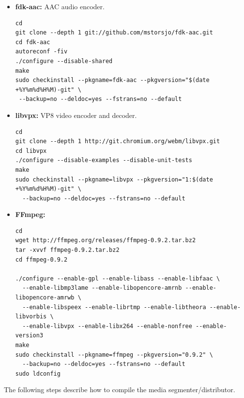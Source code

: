 \begin{itemize}
\item{\textbf{fdk-aac:}} AAC audio encoder.

\begin{code}
\begin{verbatim}
cd
git clone --depth 1 git://github.com/mstorsjo/fdk-aac.git
cd fdk-aac
autoreconf -fiv
./configure --disable-shared
make
sudo checkinstall --pkgname=fdk-aac --pkgversion="$(date +%Y%m%d%H%M)-git" \
 --backup=no --deldoc=yes --fstrans=no --default
\end{verbatim}
\end{code}

\item{\textbf{libvpx:}} VP8 video encoder and decoder.

\begin{code}
\begin{verbatim}
cd
git clone --depth 1 http://git.chromium.org/webm/libvpx.git
cd libvpx
./configure --disable-examples --disable-unit-tests
make
sudo checkinstall --pkgname=libvpx --pkgversion="1:$(date +%Y%m%d%H%M)-git" \
  --backup=no --deldoc=yes --fstrans=no --default  
\end{verbatim}
\end{code}

\item{\textbf{FFmpeg:}}
\begin{code}
\begin{verbatim}
cd
wget http://ffmpeg.org/releases/ffmpeg-0.9.2.tar.bz2
tar -xvvf ffmpeg-0.9.2.tar.bz2 
cd ffmpeg-0.9.2

./configure --enable-gpl --enable-libass --enable-libfaac \
  --enable-libmp3lame --enable-libopencore-amrnb --enable-libopencore-amrwb \
  --enable-libspeex --enable-librtmp --enable-libtheora --enable-libvorbis \
  --enable-libvpx --enable-libx264 --enable-nonfree --enable-version3
make
sudo checkinstall --pkgname=ffmpeg --pkgversion="0.9.2" \
  --backup=no --deldoc=yes --fstrans=no --default
sudo ldconfig 
\end{verbatim}
\end{code}
\end{itemize}

The following steps describe how to compile the media segmenter/distributor.

